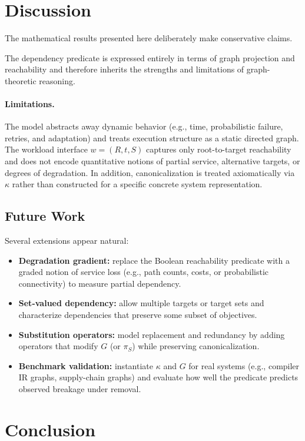\documentclass[11pt]{article}
\begin{document}
\section{Discussion}

The mathematical results presented here deliberately make conservative
claims.

The dependency predicate is expressed entirely in terms of graph
projection and reachability and therefore inherits the strengths and
limitations of graph-theoretic reasoning.

\paragraph{Limitations.}
The model abstracts away dynamic behavior (e.g., time, probabilistic
failure, retries, and adaptation) and treats execution structure as a
static directed graph. The workload interface $w=(R,t,S)$ captures only
root-to-target reachability and does not encode quantitative notions of
partial service, alternative targets, or degrees of degradation. In
addition, canonicalization is treated axiomatically via $\kappa$ rather
than constructed for a specific concrete system representation.

\subsection*{Future Work}
Several extensions appear natural:
\begin{itemize}[leftmargin=*,nosep]
  \item \textbf{Degradation gradient:} replace the Boolean reachability predicate
  with a graded notion of service loss (e.g., path counts, costs, or
  probabilistic connectivity) to measure partial dependency.
  \item \textbf{Set-valued dependency:} allow multiple targets or target sets and
  characterize dependencies that preserve some subset of objectives.
  \item \textbf{Substitution operators:} model replacement and redundancy by adding
  operators that modify $G$ (or $\pi_S$) while preserving canonicalization.
  \item \textbf{Benchmark validation:} instantiate $\kappa$ and $G$ for real systems
  (e.g., compiler IR graphs, supply-chain graphs) and evaluate how well the
  predicate predicts observed breakage under removal.
\end{itemize}
\section{Conclusion}
\end{document}
